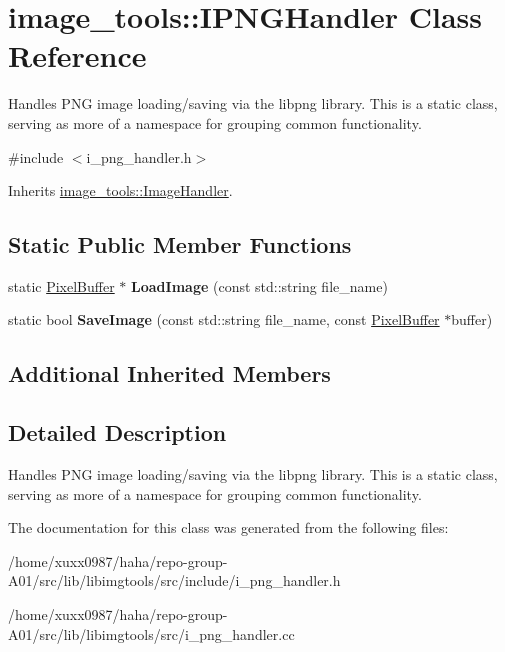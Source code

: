 \hypertarget{classimage__tools_1_1IPNGHandler}{}\section{image\+\_\+tools\+:\+:I\+P\+N\+G\+Handler Class Reference}
\label{classimage__tools_1_1IPNGHandler}


Handles P\+NG image loading/saving via the libpng library. This is a static class, serving as more of a namespace for grouping common functionality.  




{\ttfamily \#include $<$i\+\_\+png\+\_\+handler.\+h$>$}



Inherits \hyperlink{classimage__tools_1_1ImageHandler}{image\+\_\+tools\+::\+Image\+Handler}.

\subsection*{Static Public Member Functions}
\begin{DoxyCompactItemize}
\item 
static \hyperlink{classimage__tools_1_1PixelBuffer}{Pixel\+Buffer} $\ast$ {\bfseries Load\+Image} (const std\+::string file\+\_\+name)\hypertarget{classimage__tools_1_1IPNGHandler_a9ba654404b6584117fd03a260826c29b}{}\label{classimage__tools_1_1IPNGHandler_a9ba654404b6584117fd03a260826c29b}

\item 
static bool {\bfseries Save\+Image} (const std\+::string file\+\_\+name, const \hyperlink{classimage__tools_1_1PixelBuffer}{Pixel\+Buffer} $\ast$buffer)\hypertarget{classimage__tools_1_1IPNGHandler_ad69a60ad7d6f971d2b39c9cbb1e338c7}{}\label{classimage__tools_1_1IPNGHandler_ad69a60ad7d6f971d2b39c9cbb1e338c7}

\end{DoxyCompactItemize}
\subsection*{Additional Inherited Members}


\subsection{Detailed Description}
Handles P\+NG image loading/saving via the libpng library. This is a static class, serving as more of a namespace for grouping common functionality. 

The documentation for this class was generated from the following files\+:\begin{DoxyCompactItemize}
\item 
/home/xuxx0987/haha/repo-\/group-\/\+A01/src/lib/libimgtools/src/include/i\+\_\+png\+\_\+handler.\+h\item 
/home/xuxx0987/haha/repo-\/group-\/\+A01/src/lib/libimgtools/src/i\+\_\+png\+\_\+handler.\+cc\end{DoxyCompactItemize}
